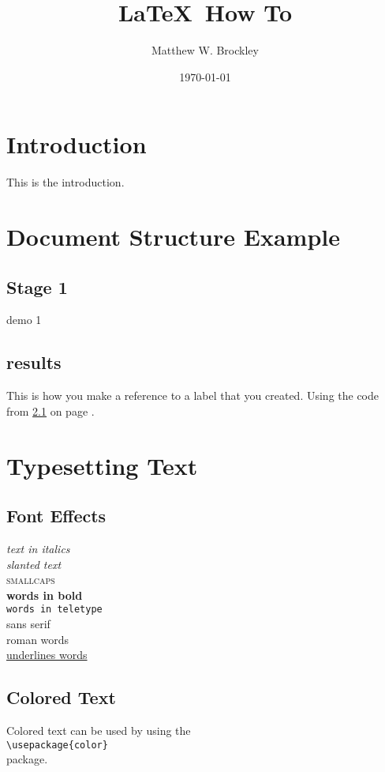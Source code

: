 \documentclass[a4paper, 12pt]{article}
\begin{document}
\title{\LaTeX\ How To}
\author{Matthew W. Brockley}
\date{\today}
\maketitle

\tableofcontents
\newpage
{}

\section{Introduction}
This is the introduction.

\section{Document Structure Example}

\subsection{Stage 1}
\label{sec1}
demo 1
\subsection{results}
This is how you make a reference to a label that you created.  Using the code from \ref{sec1} on page \pageref{sec1}.

\section{Typesetting Text}

\subsection{Font Effects}
\textit{text in italics} \\
\textsl{slanted text} \\
\textsc{smallcaps} \\
\textbf{words in bold} \\
\texttt{words in teletype} \\
\textsf{sans serif} \\
\textrm{roman words} \\
\underline{underlines words} \\

\subsection{Colored Text}
Colored text can be used by using the \\ \texttt{\textbackslash usepackage\{color\}} \\ package.
\end{document}

